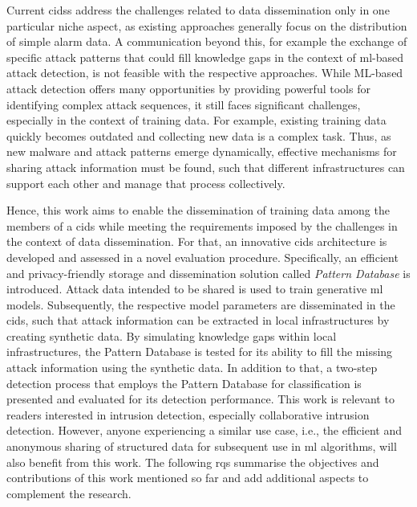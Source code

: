 \documentclass[../../main.tex]{subfiles}
\begin{document}
Current \glspl{cids} address the challenges related to data dissemination only in one particular niche aspect, as existing approaches generally focus on the distribution of simple alarm data. A communication beyond this, for example the exchange of specific attack patterns that could fill knowledge gaps in the context of \gls{ml}-based attack detection, is not feasible with the respective approaches. While ML-based attack detection offers many opportunities by providing powerful tools for identifying complex attack sequences, it still faces significant challenges, especially in the context of training data. For example, existing training data quickly becomes outdated and collecting new data is a complex task. Thus, as new malware and attack patterns emerge dynamically, effective mechanisms for sharing attack information must be found, such that different infrastructures can support each other and manage that process collectively. 

Hence, this work aims to enable the dissemination of training data among the members of a \gls{cids} while meeting the requirements imposed by the challenges in the context of data dissemination. For that, an innovative \gls{cids} architecture is developed and assessed in a novel evaluation procedure. Specifically, an efficient and privacy-friendly storage and dissemination solution called \textit{Pattern Database} is introduced. Attack data intended to be shared is used to train generative \gls{ml} models. Subsequently, the respective model parameters are disseminated in the \gls{cids}, such that attack information can be extracted in local infrastructures by creating synthetic data. By simulating knowledge gaps within local infrastructures, the Pattern Database is tested for its ability to fill the missing attack information using the synthetic data. In addition to that, a two-step detection process that employs the Pattern Database for classification is presented and evaluated for its detection performance.
\newpage
This work is relevant to readers interested in intrusion detection, especially collaborative intrusion detection. However, anyone experiencing a similar use case, i.e., the efficient and anonymous sharing of structured data for subsequent use in \gls{ml} algorithms, will also benefit from this work. The following \glspl{rq} summarise the objectives and contributions of this work mentioned so far and add additional aspects to complement the research.
\end{document}
